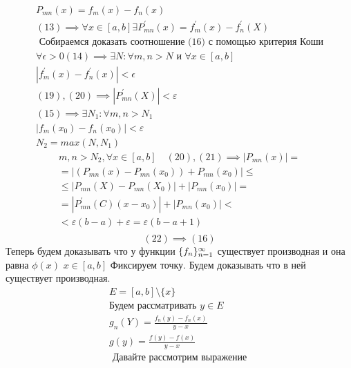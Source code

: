 \documentclass[main]{subfiles}
\begin{document}
\begin{longProof}
     \begin{gather*}
          P_{mn}(x) = f_m(x) - f_n(x)   \\
          (13) \implies \forall x \in [a,b] \exists P^\prime_{mn}(x)  = f^\prime_m(x) - f^\prime_n(X) \tag{19} \\
          \text{ Собираемся доказать соотношение (16) с помощью критерия Коши}  \\
          \forall \epsilon > 0 (14) \implies \exists N : \forall m, n > N \text{ и } \forall x \in [a,b] \\
          |f^\prime_m(x) - f^\prime_n(x) | < \epsilon \tag{20} \\
          (19),(20) \implies |P^\prime_{mn}(X) | < \varepsilon \tag{20\prime} \\
          (15) \implies \exists N_1: \forall m, n > N_1 \\
          |f_m(x_0) - f_n(x_0)| < \varepsilon \tag{21} \\
          N_2 = max(N,N_1) 
     \end{gather*}
          \begin{multline*}
          m, n > N_2, \forall x \in [a,b] \quad (20), (21) \implies |P_{mn}(x) | = \\
          =|(P_{mn}(x) - P_{mn}(x_0)) + P_{mn}(x_0) | \leq \\
           \leq |P_{mn}(X) - P_{mn}(X_0) | + |P_{mn}(x_0)| = \\
          =|P^\prime_{mn} (C)(x-x_0) | + |P_{mn}(x_0)| < \\ <
          \varepsilon(b-a) + \varepsilon = \varepsilon(b-a+1) \tag{22} \\\end{multline*}
          \[ (22) \implies (16) \]
     Теперь будем доказывать что у функции $\{f_n\}_{n=1}^\infty$ существует производная и она равна $\phi(x)$
          $x \in [a,b]$ Фиксируем точку. Будем доказывать что в ней существует производная.
          \begin{gather*}
          E = [a,b] \setminus \{ x \} \\
          \text{Будем рассматривать } y \in E \\
          g_n(Y) = \frac{f_n(y) - f_n(x)}{y-x} \tag{23} \\
          g(y) = \frac{f(y)-f(x)}{y-x} \tag{24} \\
          \text{ Давайте рассмотрим выражение }  \end{gather*}
          \begin{multline*}

\end{multline*}
\end{longProof}
\end{document}
